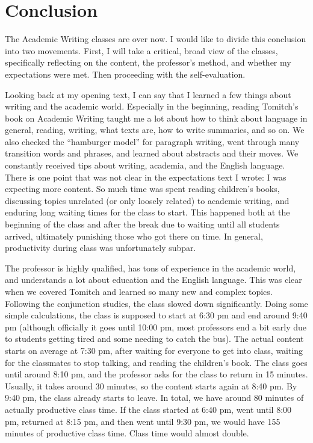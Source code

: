 \chapter{Conclusion}

The Academic Writing classes are over now. I would like to divide this conclusion into two movements. First, I will take a critical, broad view of the classes, specifically reflecting on the content, the professor's method, and whether my expectations were met. Then proceeding with the self-evaluation.

Looking back at my opening text, I can say that I learned a few things about writing and the academic world. Especially in the beginning, reading Tomitch's book on Academic Writing taught me a lot about how to think about language in general, reading, writing, what texts are, how to write summaries, and so on. We also checked the ``hamburger model'' for paragraph writing, went through many transition words and phrases, and learned about abstracts and their moves. We constantly received tips about writing, academia, and the English language. There is one point that was not clear in the expectations text I wrote: I was expecting more content. So much time was spent reading children's books, discussing topics unrelated (or only loosely related) to academic writing, and enduring long waiting times for the class to start. This happened both at the beginning of the class and after the break due to waiting until all students arrived, ultimately punishing those who got there on time. In general, productivity during class was unfortunately subpar.

The professor is highly qualified, has tons of experience in the academic world, and understands a lot about education and the English language. This was clear when we covered Tomitch and learned so many new and complex topics. Following the conjunction studies, the class slowed down significantly. Doing some simple calculations, the class is supposed to start at 6:30 pm and end around 9:40 pm (although officially it goes until 10:00 pm, most professors end a bit early due to students getting tired and some needing to catch the bus). The actual content starts on average at 7:30 pm, after waiting for everyone to get into class, waiting for the classmates to stop talking, and reading the children's book. The class goes until around 8:10 pm, and the professor asks for the class to return in 15 minutes. Usually, it takes around 30 minutes, so the content starts again at 8:40 pm. By 9:40 pm, the class already starts to leave. In total, we have around 80 minutes of actually productive class time. If the class started at 6:40 pm, went until 8:00 pm, returned at 8:15 pm, and then went until 9:30 pm, we would have 155 minutes of productive class time. Class time would almost double.

